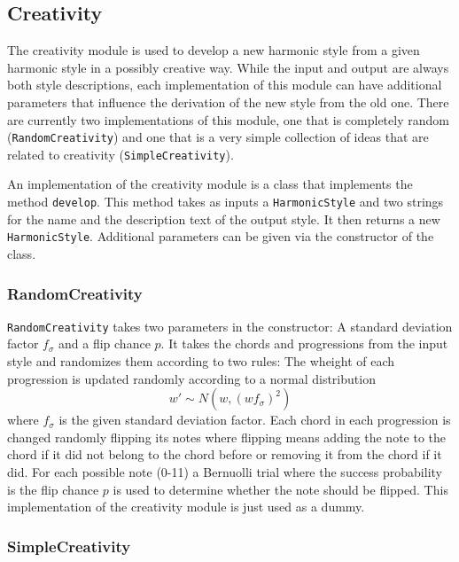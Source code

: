 \subsection{Creativity}

The creativity module is used to develop a new harmonic style from a given harmonic style in a possibly creative way.
While the input and output are always both style descriptions, each implementation of this module can have additional parameters that influence the derivation of the new style from the old one.
There are currently two implementations of this module, one that is completely random (\texttt{RandomCreativity}) and one that is a very simple collection of ideas that are related to creativity (\texttt{SimpleCreativity}).

An implementation of the creativity module is a class that implements the method \texttt{develop}.
This method takes as inputs a \texttt{HarmonicStyle} and two strings for the name and the description text of the output style.
It then returns a new \texttt{HarmonicStyle}.
Additional parameters can be given via the constructor of the class.

\subsubsection{RandomCreativity}

\texttt{RandomCreativity} takes two parameters in the constructor:
A standard deviation factor $f_\sigma$ and a flip chance $p$.
It takes the chords and progressions from the input style and randomizes them according to two rules:
The wheight of each progression is updated randomly according to a normal distribution
\[ w' \sim N(w, (w f_\sigma)^2)\]
where $f_\sigma$ is the given standard deviation factor.
Each chord in each progression is changed randomly flipping its notes where flipping means adding the note to the chord if it did not belong to the chord before or removing it from the chord if it did.
For each possible note (0-11) a Bernuolli trial where the success probability is the flip chance $p$ is used to determine whether the note should be flipped.
This implementation of the creativity module is just used as a dummy.

\subsubsection{SimpleCreativity}

